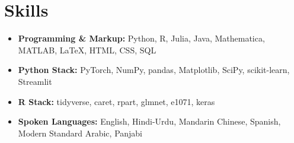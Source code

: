 \documentclass[letterpaper,10pt]{article}
\makeatletter
\newcommand{\resumeItem}[1]{
  \item\small{
    {#1 \vspace{-2pt}}
  }
}
\newcommand{\resumeSubheading}[4]{
    \item\vspace{-2pt}
    \begin{tabular*}{0.97\textwidth}[t]{l@{\extracolsep{\fill}}r}
      \textbf{#1} & #2 \\
      #3 & #4 \\
    \end{tabular*}%
}
\newcommand{\resumeSubHeadingListStart}{\begin{itemize}[leftmargin=0.15in, label=]}
\newcommand{\resumeSubHeadingListEnd}{\end{itemize}}
\makeatother
\begin{document}
\section{Skills}
\begin{itemize}[leftmargin=0.15in, label={}]
    \item \textbf{Programming \& Markup:} Python, R, Julia, Java, Mathematica, MATLAB, \LaTeX, HTML, CSS, SQL
    \item \vspace{-5pt} \textbf{Python Stack:} PyTorch, NumPy, pandas, Matplotlib, SciPy, scikit-learn, Streamlit
    \item \vspace{-5pt} \textbf{R Stack:} tidyverse, caret, rpart, glmnet, e1071, keras
    \item \vspace{-5pt} \textbf{Spoken Languages:} English, Hindi-Urdu, Mandarin Chinese, Spanish, Modern Standard Arabic, Panjabi
\end{itemize}







\end{document}
